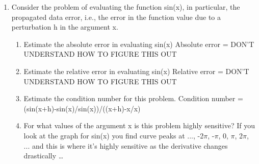 \documentclass[12pt,a4paper,oneside,draft]{article}
\begin{document}
\begin{enumerate}
     \item Consider the problem of evaluating the function sin(x), in particular, the propagated data
error, i.e., the error in the function value due to a perturbation h in the argument x.
	\begin{enumerate}
    	\item Estimate the absolute error in evaluating sin(x)
    	\newline
    	\textcolor[rgb]{1,.5,0}{Absolute error = DON'T UNDERSTAND HOW TO FIGURE THIS OUT}
    	\item Estimate the relative error in evaluating sin(x)
    	\newline
    	\textcolor[rgb]{1,.5,0}{Relative error = DON'T UNDERSTAND HOW TO FIGURE THIS OUT}
     	\item Estimate the condition number for this problem.
    	\newline
    	\textcolor[rgb]{1,.5,0}{Condition number = (sin(x+h)-sin(x)/sin(x))/((x+h)-x/x)}
     	\item For what values of the argument x is this problem highly sensitive?
    	\newline
    	\textcolor[rgb]{1,.5,0}{If you look at the graph for sin(x) you find curve peaks at ..., -2$\pi$, -$\pi$, 0, $\pi$, 2$\pi$, ... and this is where it's highly sensitive as the derivative changes drastically }\ldots
     \end{enumerate}
\end{enumerate}
\end{document}

